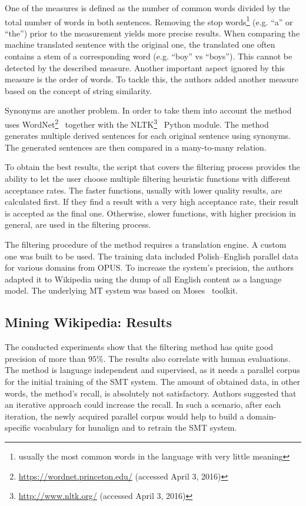 \begin{enumerate}
	One of the measures is defined as the number of common words divided by the total number of words in both sentences. Removing the stop words\footnote{usually the most common words in the language with very little meaning} (e.g. ``a'' or ``the'') prior to the measurement yields more precise results. When comparing the machine translated sentence with the original one, the translated one often contains a stem of a corresponding word (e.g. ``boy'' vs ``boys''). This cannot be detected by the described measure. Another important aspect ignored by this measure is the order of words. To tackle this, the authors added another measure based on the concept of string similarity.

	Synonyms are another problem. In order to take them into account the method uses WordNet\textregistered{}\footnote{\url{https://wordnet.princeton.edu/} (accessed April 3, 2016)}~\cite{Miller95}\cite{Fellbaum98} together with the NLTK\footnote{\url{http://www.nltk.org/} (accessed April 3, 2016)}~\cite{Loper02} Python module. The method generates multiple derived sentences for each original sentence using synonyms. The generated sentences are then compared in a many-to-many relation.
	
	To obtain the best results, the script that covers the filtering process provides the ability to let the user choose multiple filtering heuristic functions with different acceptance rates. The faster functions, usually with lower quality results, are calculated first. If they find a result with a very high acceptance rate, their result is accepted as the final one. Otherwise, slower functions, with higher precision in general, are used in the filtering process.
\end{enumerate}

The filtering procedure of the method requires a translation engine. A custom one was built to be used. The training data included Polish--English parallel data for various domains from OPUS. To increase the system's precision, the authors adapted it to Wikipedia using the dump of all English content as a language model. The underlying MT system was based on Moses~\cite{Koehn07}\cite{Moses} toolkit.

\subsection{Mining Wikipedia: Results}
\label{subsection:mining_wikipedia_results}

The conducted experiments show that the filtering method has quite good precision of more than $95\%$. The results also correlate with human evaluations. The method is language independent and supervised, as it needs a parallel corpus for the initial training of the SMT system. The amount of obtained data, in other words, the method's recall, is absolutely not satisfactory. Authors suggested that an iterative approach could increase the recall. In such a scenario, after each iteration, the newly acquired parallel corpus would help to build a domain-specific vocabulary for hunalign and to retrain the SMT system.

